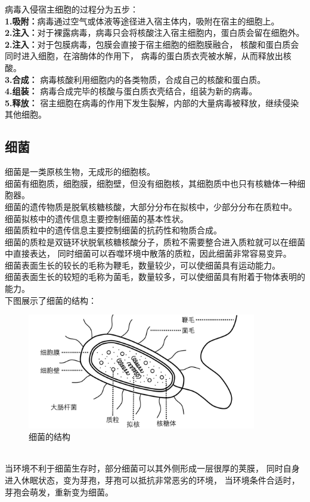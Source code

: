\documentclass[UTF8]{ctexart}
\begin{document}
    病毒入侵宿主细胞的过程分为五步：\\[4mm]
    \textbf{1.吸附：}病毒通过空气或体液等途径进入宿主体内，吸附在宿主的细胞上。\\[4mm]
    \textbf{2.注入：}对于裸露病毒，病毒只会将核酸注入宿主细胞内，蛋白质会留在细胞外。\\[4mm]
    \textbf{2.注入：}对于包膜病毒，包膜会直接于宿主细胞的细胞膜融合，
    核酸和蛋白质会同时进入细胞，在溶酶体的作用下，
    病毒的蛋白质衣壳被水解，从而释放出核酸。\\[4mm]
    \textbf{3.合成：}
    病毒核酸利用细胞内的各类物质，合成自己的核酸和蛋白质。\\[4mm]
    \textbf{4.组装：}
    病毒合成完毕的核酸与蛋白质衣壳结合，组装为新的病毒。\\[4mm]
    \textbf{5.释放：}
    宿主细胞在病毒的作用下发生裂解，内部的大量病毒被释放，继续侵染其他细胞。\\

\subsection{细菌}
    细菌是一类原核生物，无成形的细胞核。\\[6mm]
    细菌有细胞质，细胞膜，细胞壁，但没有细胞核，其细胞质中也只有核糖体一种细胞器。\\[3mm]
    细菌的遗传物质是脱氧核糖核酸，大部分分布在拟核中，少部分分布在质粒中。\\[3mm]
    细菌拟核中的遗传信息主要控制细菌的基本性状。\\[3mm]
    细菌质粒中的遗传信息主要控制细菌的抗药性和物质合成。\\[3mm]
    细菌的质粒是双链环状脱氧核糖核酸分子，质粒不需要整合进入质粒就可以在细菌中直接表达，
    同时细菌可以吞噬环境中散落的质粒，因此细菌非常容易变异。\\[6mm]
    细菌表面生长的较长的毛称为鞭毛，数量较少，可以使细菌具有运动能力。\\[3mm]
    细菌表面生长的较短的毛称为菌毛，数量较多，可以使细菌具有附着于物体表明的能力。\\[6mm]
    下图展示了细菌的结构：
    \begin{figure}[h]
        \begin{center}
            \includegraphics[width=10cm]{BiologyImage/51.jpg}
            \caption{细菌的结构}
        \end{center}
    \end{figure}\\
    当环境不利于细菌生存时，部分细菌可以其外侧形成一层很厚的荚膜，
    同时自身进入休眠状态，变为芽孢，芽孢可以抵抗非常恶劣的环境，
    当环境条件合适时，芽孢会萌发，重新变为细菌。
\end{document}
